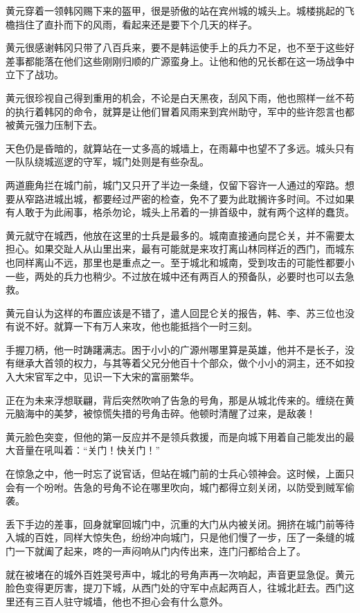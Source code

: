 黄元穿着一领韩冈赐下来的盔甲，很是骄傲的站在宾州城的城头上。城楼挑起的飞檐挡住了直扑而下的风雨，看起来还是要下个几天的样子。

黄元很感谢韩冈只带了八百兵来，要不是韩运使手上的兵力不足，也不至于这些好差事都能落在他们这些刚刚归顺的广源蛮身上。让他和他的兄长都在这一场战争中立下了战功。

黄元很珍视自己得到重用的机会，不论是白天黑夜，刮风下雨，他也照样一丝不苟的执行着韩冈的命令，就算是让他们冒着风雨来到宾州助守，军中的些许怨言也都被黄元强力压制下去。

天色仍是昏暗的，就算站在一丈多高的城墙上，在雨幕中也望不了多远。城头只有一队队绕城巡逻的守军，城门处则是有些杂乱。

两道鹿角拦在城门前，城门又只开了半边一条缝，仅留下容许一人通过的窄路。想要从窄路进城出城，都要经过严密的检查，免不了要为此耽搁许多时间。不过如果有人敢于为此闹事，格杀勿论，城头上吊着的一排首级中，就有两个这样的蠢货。

黄元就守在城西，他放在这里的士兵是最多的。城南直接通向昆仑关，并不需要太担心。如果交趾人从山里出来，最有可能就是来攻打离山林同样近的西门，而城东也同样离山不远，那里也是重点之一。至于城北和城南，受到攻击的可能性都要小一些，两处的兵力也稍少。不过放在城中还有两百人的预备队，必要时也可以去急救。

黄元自认为这样的布置应该是不错了，遣人回昆仑关的报告，韩、李、苏三位也没有说不好。就算一下有万人来攻，他也能抵挡个一时三刻。

手握刀柄，他一时踌躇满志。困于小小的广源州哪里算是英雄，他并不是长子，没有继承大首领的权力，与其等着父兄分他百十个部众，做个小小的洞主，还不如投入大宋官军之中，见识一下大宋的富丽繁华。

正在为未来浮想联翩，背后突然吹响了告急的号角，那是从城北传来的。缠绕在黄元脑海中的美梦，被惊慌失措的号角击碎。他顿时清醒了过来，是敌袭！

黄元脸色突变，但他的第一反应并不是领兵救援，而是向城下用着自己能发出的最大音量在吼叫着：“关门！快关门！”

在惊急之中，他一时忘了说官话，但站在城门前的士兵心领神会。这时候，上面只会有一个吩咐。告急的号角不论在哪里吹向，城门都得立刻关闭，以防受到贼军偷袭。

丢下手边的差事，回身就窜回城门中，沉重的大门从内被关闭。拥挤在城门前等待入城的百姓，同样大惊失色，纷纷冲向城门，只是他们慢了一步，压了一条缝的城门一下就阖了起来，咚的一声闷响从门内传出来，连门闩都给合上了。

就在被堵在的城外百姓哭号声中，城北的号角声再一次响起，声音更显急促。黄元脸色变得更厉害，提刀下城，从西门处的守军中点起两百人，往城北赶去。西门这里还有三百人驻守城墙，他也不担心会有什么意外。

